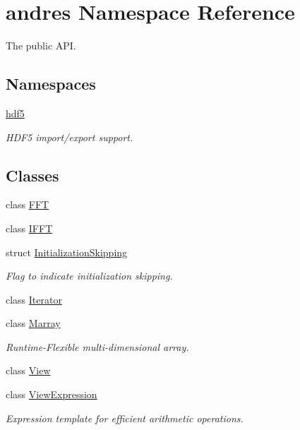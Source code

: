 \hypertarget{namespaceandres}{}\section{andres Namespace Reference}
\label{namespaceandres}


The public A\+P\+I.  


\subsection*{Namespaces}
\begin{DoxyCompactItemize}
\item 
 \hyperlink{namespaceandres_1_1hdf5}{hdf5}
\begin{DoxyCompactList}\small\item\em H\+D\+F5 import/export support. \end{DoxyCompactList}\end{DoxyCompactItemize}
\subsection*{Classes}
\begin{DoxyCompactItemize}
\item 
class \hyperlink{classandres_1_1FFT}{F\+F\+T}
\item 
class \hyperlink{classandres_1_1IFFT}{I\+F\+F\+T}
\item 
struct \hyperlink{structandres_1_1InitializationSkipping}{Initialization\+Skipping}
\begin{DoxyCompactList}\small\item\em Flag to indicate initialization skipping. \end{DoxyCompactList}\item 
class \hyperlink{classandres_1_1Iterator}{Iterator}
\item 
class \hyperlink{classandres_1_1Marray}{Marray}
\begin{DoxyCompactList}\small\item\em Runtime-\/\+Flexible multi-\/dimensional array. \end{DoxyCompactList}\item 
class \hyperlink{classandres_1_1View}{View}
\item 
class \hyperlink{classandres_1_1ViewExpression}{View\+Expression}
\begin{DoxyCompactList}\small\item\em Expression template for efficient arithmetic operations. \end{DoxyCompactList}\end{DoxyCompactItemize}
